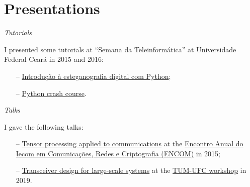 \section{Presentations}

{\sl Tutorials}

I presented some tutorials at ``Semana da Teleinformática'' at Universidade Federal Cear\'a in 2015 and 2016:
\begin{itemize}
	\item[--] \href{https://github.com/lnribeiro/setic2015/blob/master/esteganografia.ipynb}{Introdução à esteganografia digital com Python};
	\item[--] \href{https://github.com/lnribeiro/setic2015/blob/master/intropython.ipynb}{Python crash course}.
\end{itemize}

{\sl Talks}

I gave the following talks:
\begin{itemize}
	\item[--] \href{https://github.com/lnribeiro/lnribeiro.github.io/blob/master/assets/pdf/encom15.pdf}{Tensor processing applied to communications} at the \href{https://iecom.org.br/encom2015/#}{Encontro Anual do Iecom em Comunicaç\~{o}es, Redes e Criptografia (ENCOM)} in 2015;
	\item[--] \href{http://lnribeiro.github.io/assets/pdf/tum19.pdf}{Transceiver design for large-scale systems} at the \href{http://www.msv.ei.tum.de/workshop-tum-ufc/}{TUM-UFC workshop} in 2019.
\end{itemize}